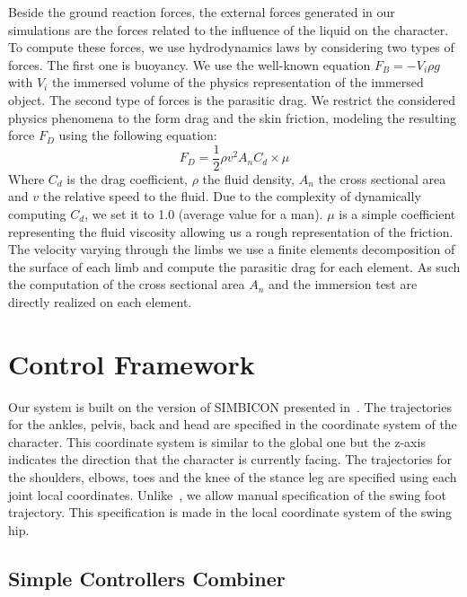 \documentclass[conference]{acmsiggraph}
\begin{document}
Beside the ground reaction forces, the external forces generated in our simulations are the forces related to the influence of the liquid on the character. To compute these forces, we use hydrodynamics laws by considering two types of forces. The first one is buoyancy. We use the well-known equation $F_{B}=-V_i \rho g$ with $V_i$ the immersed volume of the physics representation of the immersed object. The second type of forces is the parasitic drag. We restrict the considered physics phenomena to the form drag and the skin friction, modeling the resulting force $F_D$ using the following equation:
$$
F_D=\frac{1}{2} \rho v^2 A_n C_d \times \mu
$$
Where $C_d$ is the drag coefficient, $\rho$ the fluid density, $A_n$ the cross sectional area and $v$ the relative speed to the fluid. Due to the complexity of dynamically computing $C_d$, we set it to 1.0 (average value for a man). $\mu$ is a simple coefficient representing the fluid viscosity allowing us a rough representation of the friction. The velocity varying through the limbs we use a finite elements decomposition of the surface of each limb and compute the parasitic drag for each element. As such the computation of the cross sectional area $A_n$ and the immersion test are directly realized on each element.

\section{Control Framework}
\label{sec:control_framework}

Our system is built on the version of SIMBICON presented in~\cite{coros2010generalized}. The trajectories for the ankles, pelvis, back and head are specified in the coordinate system of the character. This coordinate system is similar to the global one but the z-axis indicates the direction that the character is currently facing. The trajectories for the shoulders, elbows, toes and the knee of the stance leg are specified using each joint local coordinates. Unlike~\cite{coros2010generalized}, we allow manual specification of the swing foot trajectory. This specification is made in the local coordinate system of the swing hip.

\subsection{Simple Controllers Combiner}
\label{sec:multi_state}
\end{document}
